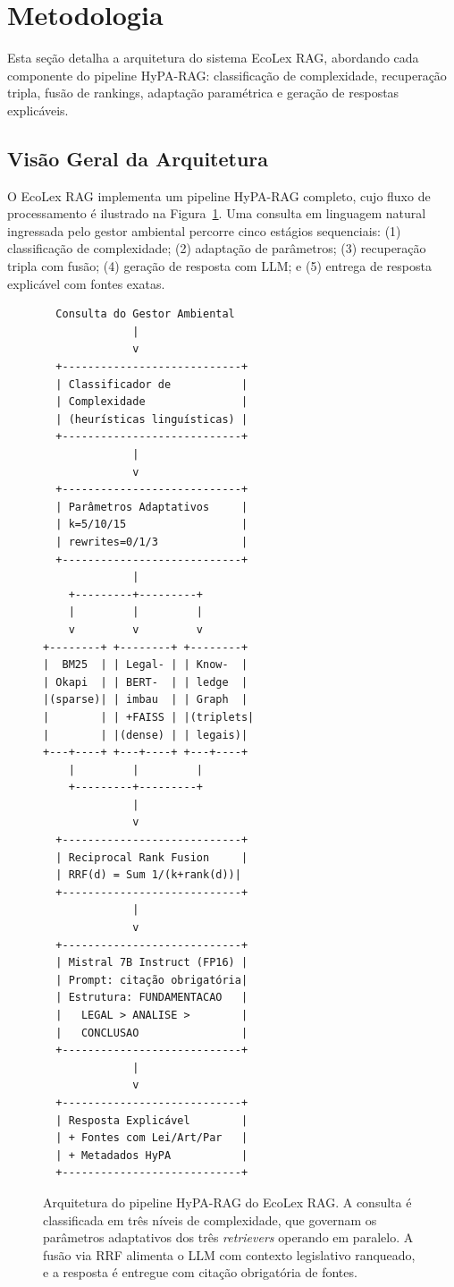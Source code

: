 \documentclass[12pt]{article}
\begin{document}
\section{Metodologia}

Esta seção detalha a arquitetura do sistema EcoLex RAG, abordando cada componente do pipeline HyPA-RAG: classificação de complexidade, recuperação tripla, fusão de rankings, adaptação paramétrica e geração de respostas explicáveis.

\subsection{Visão Geral da Arquitetura}

O EcoLex RAG implementa um pipeline HyPA-RAG completo, cujo fluxo de processamento é ilustrado na Figura~\ref{fig:arquitetura}. Uma consulta em linguagem natural ingressada pelo gestor ambiental percorre cinco estágios sequenciais: (1) classificação de complexidade; (2) adaptação de parâmetros; (3) recuperação tripla com fusão; (4) geração de resposta com LLM; e (5) entrega de resposta explicável com fontes exatas.

\begin{figure}[ht]
\centering
\begin{small}
\begin{verbatim}
  Consulta do Gestor Ambiental
              |
              v
  +----------------------------+
  | Classificador de           |
  | Complexidade               |
  | (heurísticas linguísticas) |
  +----------------------------+
              |
              v
  +----------------------------+
  | Parâmetros Adaptativos     |
  | k=5/10/15                  |
  | rewrites=0/1/3             |
  +----------------------------+
              |
    +---------+---------+
    |         |         |
    v         v         v
+--------+ +--------+ +--------+
|  BM25  | | Legal- | | Know-  |
| Okapi  | | BERT-  | | ledge  |
|(sparse)| | imbau  | | Graph  |
|        | | +FAISS | |(triplets|
|        | |(dense) | | legais)|
+---+----+ +---+----+ +---+----+
    |         |         |
    +---------+---------+
              |
              v
  +----------------------------+
  | Reciprocal Rank Fusion     |
  | RRF(d) = Sum 1/(k+rank(d))|
  +----------------------------+
              |
              v
  +----------------------------+
  | Mistral 7B Instruct (FP16) |
  | Prompt: citação obrigatória|
  | Estrutura: FUNDAMENTACAO   |
  |   LEGAL > ANALISE >        |
  |   CONCLUSAO                |
  +----------------------------+
              |
              v
  +----------------------------+
  | Resposta Explicável        |
  | + Fontes com Lei/Art/Par   |
  | + Metadados HyPA           |
  +----------------------------+
\end{verbatim}
\end{small}
\caption{Arquitetura do pipeline HyPA-RAG do EcoLex RAG. A consulta é classificada em três níveis de complexidade, que governam os parâmetros adaptativos dos três \textit{retrievers} operando em paralelo. A fusão via RRF alimenta o LLM com contexto legislativo ranqueado, e a resposta é entregue com citação obrigatória de fontes.}
\label{fig:arquitetura}
\end{figure}
\end{document}
